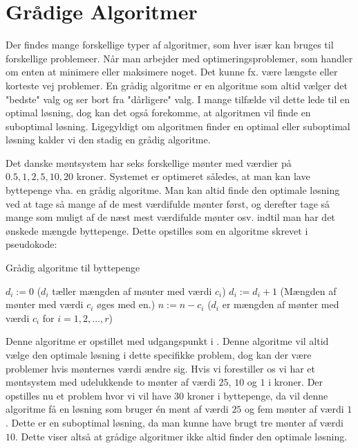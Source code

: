 \section{Grådige Algoritmer}
Der findes mange forskellige typer af algoritmer, som hver især kan bruges til forskellige problemeer. Når man arbejder med optimeringsproblemer, som handler om enten at minimere eller maksimere noget. Det kunne fx. være længste eller korteste vej problemer.
En grådig algoritme er en algoritme som altid vælger det "bedste" valg og ser bort fra "dårligere" valg. I mange tilfælde vil dette lede til en optimal løsning, dog kan det også forekomme, at algoritmen vil finde en suboptimal løsning. Ligegyldigt om algoritmen finder en optimal eller suboptimal løsning kalder vi den stadig en grådig algoritme.

\begin{exmp}
Det danske møntsystem har seks forskellige mønter med værdier på $0.5, 1, 2, 5, 10, 20$ kroner. Systemet er optimeret således, at man kan lave byttepenge vha. en grådig algoritme. Man kan altid finde den optimale løsning ved at tage så mange af de mest værdifulde mønter først, og derefter tage så mange som muligt af de næst mest værdifulde mønter osv. indtil man har det ønskede mængde byttepenge.
Dette opstilles som en algoritme skrevet i pseudokode:
\begin{algorithm} [H]
\caption{Grådig algoritme til byttepenge}
\begin{algorithmic}[1]

\EndProcedure
{}
    \State $d_i:=0$ ($d_i$ tæller mængden af mønter med værdi $c_i$)
    	\State $d_i := d_i+1$ (Mængden af mønter med værdi $c_i$ øges med en.)
    	\State $n := n-c_i$
\EndWhile
\EndFor
\State ($d_i$ er mængden af mønter med værdi $c_i$ for $i=1,2,\dotsc,r$)
\end{algorithmic}
\end{algorithm}
Denne algoritme er opstillet med udgangspunkt i \citep{dmat}. Denne algoritme vil altid vælge den optimale løsning i dette specifikke problem, dog kan der være problemer hvis mønternes værdi ændre sig. 
Hvis vi forestiller os vi har et møntsystem med udelukkende to mønter af værdi $25$, $10$ og $1$ i kroner. Der opstilles nu et problem hvor vi vil have $30$ kroner i byttepenge, da vil denne algoritme få en løsning som bruger én mønt af værdi $25$ og fem mønter af værdi $1$. Dette er en suboptimal løsning, da man kunne have brugt tre mønter af værdi $10$.
Dette viser altså at grådige algoritmer ikke altid finder den optimale løsning.
\end{exmp}
